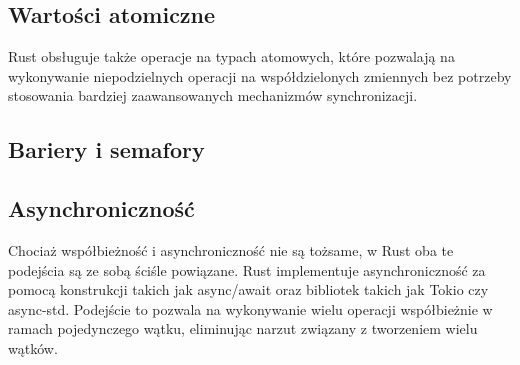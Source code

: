 \subsection{Wartości atomiczne}
Rust obsługuje także operacje na typach atomowych, które pozwalają na wykonywanie niepodzielnych operacji na współdzielonych zmiennych bez potrzeby stosowania bardziej zaawansowanych mechanizmów synchronizacji.

\subsection{Bariery i semafory}

\subsection{Asynchroniczność}
Chociaż współbieżność i asynchroniczność nie są tożsame, w Rust oba te podejścia są ze sobą ściśle powiązane. Rust implementuje asynchroniczność za pomocą konstrukcji takich jak async/await oraz bibliotek takich jak Tokio czy async-std. Podejście to pozwala na wykonywanie wielu operacji współbieżnie w ramach pojedynczego wątku, eliminując narzut związany z tworzeniem wielu wątków.
